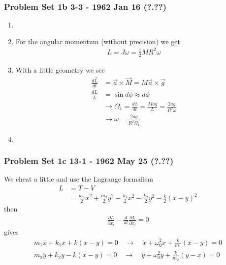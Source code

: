\documentclass[10pt,a4paper]{article}
\theoremstyle{definition}
\begin{document}
\subsubsection{Problem Set 1b  3-3 - 1962 Jan 16 (?.??)}
\begin{enumerate}
    \item 
    \item For the angular momentum (without precision) we get
    \begin{align}
        L=J\omega=\frac{1}{2}MR^2\omega
    \end{align}
    \item With a little geometry we see
    \begin{align}
        \frac{d\vec{L}}{dt}&=\vec{a}\times\vec{M}=M\vec{a}\times\vec{g}\\
        \frac{dL}{L}&=\sin d\phi\approx d\phi\\
        &\rightarrow\Omega_1=\frac{d\phi}{dt}=\frac{Mag}{L}=\frac{2ag}{R^2\omega}\\
        &\rightarrow\omega=\frac{2ag}{R^2\Omega_1}
    \end{align}
    \item
\end{enumerate}

\subsubsection{Problem Set 1c  13-1 - 1962 May 25 (?.??)}
We cheat a little and use the Lagrange formalism 
\begin{align}
L&=T-V\\
&=\frac{m_1}{2}\dot{x}^2+\frac{m_2}{2}\dot{y}^2-\frac{k_1}{2}x^2-\frac{k_2}{2}y^2-\frac{k}{2}(x-y)^2
\end{align}
then
\begin{align}
\frac{\partial L}{\partial x_i}-\frac{d}{dt}\frac{\partial L}{\partial\dot{x}_i}=0
\end{align}
gives
\begin{align}
m_1\ddot{x}+k_1x+k(x-y)=0\quad\rightarrow\quad \ddot{x}+\omega_0^2x+\frac{k}{m_1}(x-y)=0\\
m_2\ddot{y}+k_2y-k(x-y)=0\quad\rightarrow\quad \ddot{y}+\omega_0^2y+\frac{k}{m_2}(y-x)=0
\end{align}
\end{document}
